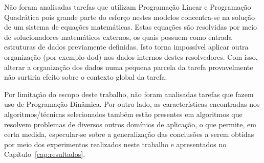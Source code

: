 Não foram analisadas tarefas que utilizam Programação Linear e Programação Quadrática pois grande parte do esforço nestes modelos concentra-se na solução de um sistema de equações matemáticas.
Estas equações são resolvidas por meio de solucionadores matemáticos externos, os quais possuem como entrada estruturas de dados previamente definidas.
Isto torna impossível aplicar outra organização (por exemplo \ac{dod}) nos dados internos destes resolvedores.
Com isso, alterar a organização dos dados numa pequena parcela da tarefa provavelmente não surtiria efeito sobre o contexto global da tarefa.

Por limitação do escopo deste trabalho, não foram analisadas tarefas que fazem uso de Programação Dinâmica.
Por outro lado, as características encontradas nos algoritmos/técnicas selecionados também estão presentes em algoritmos que resolvem problemas de diversos outros domínios de aplicação, o que permite, em certa medida, especular-se sobre a generalização das conclusões a serem obtidas por meio dos experimentos realizados neste trabalho e apresentados no Capítulo~\ref{cap:resultados}.
